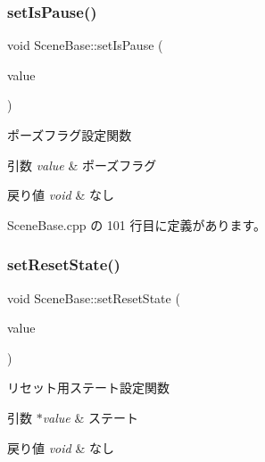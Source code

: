 \subsubsection{\texorpdfstring{set\+Is\+Pause()}{setIsPause()}}
{\footnotesize\ttfamily void Scene\+Base\+::set\+Is\+Pause (\begin{DoxyParamCaption}\item[{bool}]{value }\end{DoxyParamCaption})}



ポーズフラグ設定関数 


\begin{DoxyParams}{引数}
{\em value} & ポーズフラグ \\
\hline
\end{DoxyParams}

\begin{DoxyRetVals}{戻り値}
{\em void} & なし \\
\hline
\end{DoxyRetVals}


 Scene\+Base.\+cpp の 101 行目に定義があります。

\mbox{\label{class_scene_base_a3d19d74cca158aee1affd1498bf1bd90}} 
\subsubsection{\texorpdfstring{set\+Reset\+State()}{setResetState()}}
{\footnotesize\ttfamily void Scene\+Base\+::set\+Reset\+State (\begin{DoxyParamCaption}\item[{\mbox{\hyperlink{class_scene_base_1_1_state_base}{State\+Base}} $\ast$}]{value }\end{DoxyParamCaption})}



リセット用ステート設定関数 


\begin{DoxyParams}{引数}
{\em $\ast$value} & ステート \\
\hline
\end{DoxyParams}

\begin{DoxyRetVals}{戻り値}
{\em void} & なし \\
\hline
\end{DoxyRetVals}


